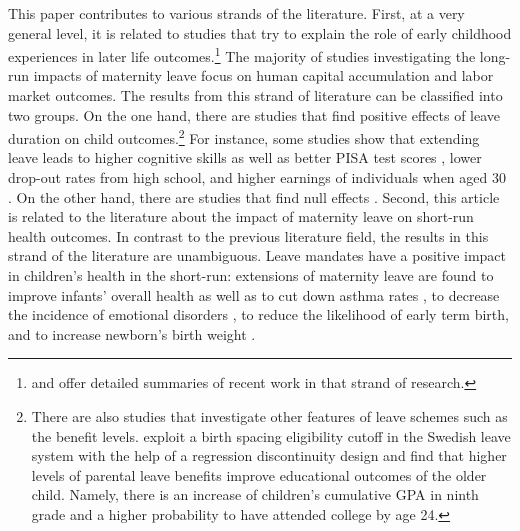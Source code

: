 \documentclass[11pt, a4paper]{article} %
\begin{document}
This paper contributes to various strands of the literature. First, at a very general level, it is related to studies that try to explain the role of early childhood experiences in later life outcomes.\footnote{\cite{currie2011human} and \cite{almond2017childhood} offer detailed summaries of recent work in that strand of research.} The majority of studies investigating the long-run impacts of maternity leave focus on human capital accumulation and labor market outcomes. The results from this strand of literature can be classified into two groups. On the one hand, there are studies that find positive effects of leave duration on child outcomes.\footnote{There are also studies that investigate other features of leave schemes such as the benefit levels. \cite{ginja2020parental} exploit a birth spacing eligibility cutoff in the Swedish leave system with the help of a regression discontinuity design and find that higher levels of parental leave benefits improve educational outcomes of the older child. Namely, there is an increase of children's cumulative GPA in ninth grade and a higher probability to have attended college by age 24.} For instance, some studies show that extending leave leads to higher cognitive skills \citep{albagli2018} as well as better PISA test scores \citep{danzer2017}, lower drop-out rates from high school, and higher earnings of individuals when aged 30 \citep{carneiro2015flying}. On the other hand, there are studies that find null effects \citep{Dahl2016Case, Dustmann2012}. Second, this article is related to the literature about the impact of maternity leave on short-run health outcomes. In contrast to the previous literature field, the results in this strand of the literature are unambiguous. Leave mandates have a positive impact in children's health in the short-run: extensions of maternity leave are found to improve infants' overall health as well as to cut down asthma rates \citep{bullinger2019effect}, to decrease the incidence of emotional disorders \citep{sayour2019impact}, to reduce the likelihood of early term birth, and to increase newborn's birth weight \citep{stearns2015effects}.\newline
\end{document}
